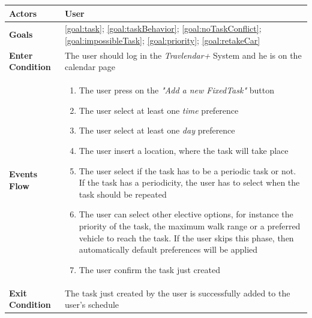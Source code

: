 \begin{table}[H]
	\centering
    
    \begin{tabular}{|p{3.5cm}|p{10.3cm}|}
    
    \hline
    \textbf{\large{Actors}}  			& \tabitem User\\
    
    \hline
    \textbf{\large{Goals}} 				& \ref{goal:task}; \ref{goal:taskBehavior}; \ref{goal:noTaskConflict}; \ref{goal:impossibleTask}; \ref{goal:priority}; \ref{goal:retakeCar}\\
    
    \hline
    \textbf{\large{Enter Condition}}	& The user should log in the \emph{Travlendar+} System and he 												is on the calendar page\\
    
    \hline
    \textbf{\large{Events Flow}}		& \begin{enumerate}[leftmargin=0.5cm]
                                          	\item The user press on the \emph{"Add a new FixedTask"} button
                                            \item The user select at least one \emph{time} preference
                                            \item The user select at least one \emph{day} preference
                                            \item The user insert a location, where the task will take place
                                            \item The user select if the task has to be a periodic task 														or not. If the task has a periodicity, the user has to 															select when the task should be repeated
                                            \item The user can select other elective options, for instance the priority of the task, the maximum walk range or a preferred vehicle to reach the task. If the user skips this phase, then automatically default preferences will be applied
                                            \item The user confirm the task just created
                                          \end{enumerate}
    										\\
    \hline
    \textbf{\large{Exit Condition}} 	& The task just created by the user is successfully added to the user's 											schedule\\
    

\end{tabular}
\end{table}
